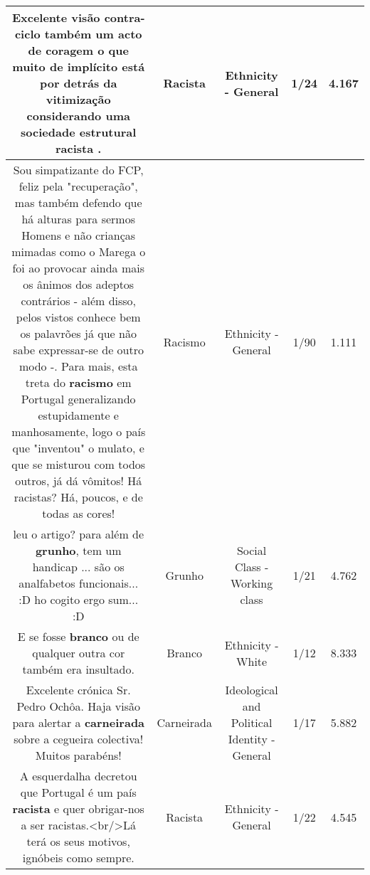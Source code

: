 \documentclass[11pt]{article}
\newlength\mylength
\begin{document}
\begin{center}
\begin{longtable}{|C{.65\mylength}|C{.30\mylength}|C{.12\mylength}|C{.12\mylength}|C{.12\mylength}|}
  \small Excelente visão contra-ciclo também um acto de coragem o que muito de implícito está por detrás da vitimização considerando uma sociedade estrutural \textbf{racista} .\normalsize   & Racista & Ethnicity - General & 1/24 & 4.167 \\  \hline
  \small Sou simpatizante do FCP, feliz pela "recuperação", mas também defendo que há alturas para sermos Homens e não crianças mimadas como o Marega o foi ao provocar ainda mais os ânimos dos adeptos contrários - além disso, pelos vistos conhece bem os palavrões já que não sabe expressar-se de outro modo -. Para mais,   esta treta do \textbf{racismo} em Portugal generalizando estupidamente e manhosamente, logo o país que "inventou" o mulato, e que se misturou com todos outros, já dá vômitos! Há racistas? Há, poucos, e de todas as cores!\normalsize   & Racismo & Ethnicity - General & 1/90 & 1.111 \\  \hline
  \small leu o artigo? para além de \textbf{grunho}, tem um handicap ... são os analfabetos funcionais... :D ho cogito ergo sum... :D\normalsize   & Grunho & Social Class - Working class & 1/21 & 4.762 \\  \hline
  \small E se fosse \textbf{branco} ou de qualquer outra cor também era insultado.\normalsize   & Branco & Ethnicity - White & 1/12 & 8.333 \\  \hline
  \small Excelente crónica Sr. Pedro Ochôa. Haja visão para alertar a \textbf{carneirada} sobre a cegueira colectiva! Muitos parabéns!\normalsize   & Carneirada & Ideological and Political Identity - General & 1/17 & 5.882 \\  \hline
  \small A esquerdalha decretou que Portugal é um país \textbf{racista} e quer obrigar-nos a ser racistas.<br/>Lá terá os seus motivos, ignóbeis como sempre.\normalsize   & Racista & Ethnicity - General & 1/22 & 4.545 \\  \hline
  
\end{longtable}
\end{center}
\end{document}
